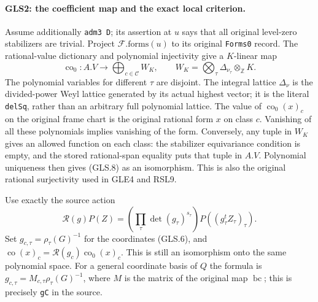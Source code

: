 \paragraph{GLS2: the coefficient map and the exact local criterion.}
\label{claim:GLS2}
Assume additionally \texttt{adm3 D}; its assertion at $u$ says that
all original level-zero stabilizers are trivial.  Project
$\mathcal F.\mathrm{forms}(u)$ to its original \texttt{Forms0} record.
The rational-value dictionary and polynomial injectivity give a
$K$-linear map
\[
 \operatorname{co}_0:A.V\longrightarrow
       \bigoplus_{c\in\mathcal C}W_K,\qquad
 W_K=\bigotimes_\tau \Delta_{\nu_\tau}\otimes_{\mathbb Z}K.
 \tag{GLS.8}
\]
The polynomial variables for different $\tau$ are disjoint.  The
integral lattice $\Delta_\nu$ is the divided-power Weyl lattice
generated by its actual highest vector; it is the literal
\texttt{delSq}, rather than an arbitrary full polynomial lattice.
The value of $\operatorname{co}_0(x)_c$ on the original frame chart is
the original rational form $x$ on class $c$.  Vanishing of all these
polynomials implies vanishing of the form.  Conversely, any tuple in
$W_K$ gives an allowed function on each class: the stabilizer
equivariance condition is empty, and the stored rational-span equality
puts that tuple in $A.V$.  Polynomial uniqueness then gives (GLS.8)
as an isomorphism.  This is also the original rational surjectivity
used in GLE4 and RSL9.

Use exactly the source action
\[
 \mathcal R(g)P(Z)=\left(\prod_\tau\det(g_\tau)^{s_\tau}\right)
                              P((g_\tau^{t}Z_\tau)_\tau).
 \tag{GLS.9}
\]
Set $g_{c,\tau}=\rho_\tau(G)^{-1}$ for the coordinates (GLS.6), and
$\operatorname{co}(x)_c=\mathcal R(g_c)\operatorname{co}_0(x)_c$.
This is still an isomorphism onto the same polynomial space.  For a
general coordinate basis of $Q$ the formula is
$g_{c,\tau}=M_{c,\tau}\rho_\tau(G)^{-1}$, where $M$ is the matrix
of the original map $\operatorname{bc}$; this is precisely
\texttt{gC} in the source.

